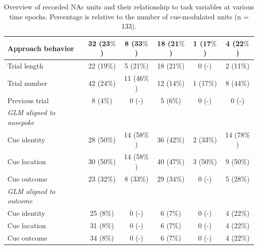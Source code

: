 \documentclass[11pt]{article}
\begin{document}
\begin{table}[p]
\begin{tabular}{l c  c c c c}
\hline
\hspace{6mm}Approach behavior      & 32 (23$\%$)         & 8 (33$\%$)          & 18 (21$\%$)          & 1 (17$\%$)          & 4 (22$\%$)\\
\hline
\hspace{6mm}Trial length       & 22 (19$\%$)        & 5 (21$\%$)          & 18 (21$\%$)         & 0 (-)         & 2 (11$\%$)\\
\hline
\hspace{6mm}Trial number       & 42 (24$\%$)         & 11 (46$\%$)          & 12 (14$\%$)         & 1 (17$\%$)          & 8 (44$\%$)\\
\hline
\hspace{6mm}Previous trial       & 8 (4$\%$)         & 0 (-)          &5 (6$\%$)          & 0 (-)          & 0 (-)\\
\hline
\hspace{3mm}\textit{GLM aligned to nosepoke}                       &         &       &          &          &\\
\hline
\hspace{6mm}Cue identity       & 28 (50$\%$)         &14 (58$\%$)          & 36 (42$\%$)          & 2 (33$\%$)          &14 (78$\%$)\\
\hline
\hspace{6mm}Cue location       & 30 (50$\%$)         &14 (58$\%$)          & 40 (47$\%$)          & 3 (50$\%$)          & 9 (50$\%$)\\
\hline
\hspace{6mm}Cue outcome       & 23 (32$\%$)        & 8 (33$\%$)          & 29 (34$\%$)        & 0 (-)          & 5 (28$\%$)\\
\hline
\hspace{3mm}\textit{GLM aligned to outcome}                       &         &       &          &          &\\
\hline
\hspace{6mm}Cue identity       & 25 (8$\%$)        & 0 (-)          & 6 (7$\%$)       & 0 (-)          &4 (22$\%$)\\
\hline
\hspace{6mm}Cue location       & 31 (8$\%$)        & 0 (-)          & 6 (7$\%$)       & 0 (-)          &4 (22$\%$)\\
\hline
\hspace{6mm}Cue outcome       & 34 (8$\%$)        & 0 (-)          & 6 (7$\%$)       & 0 (-)          &4 (22$\%$)\\
\hline

\end{tabular}
\caption {Overview of recorded NAc units and their relationship to
  task variables at various time epochs. Percentage is relative to the
  number of cue-modulated units (n = 133).} \label{tbl1} 
\end{table}
\end{document}

